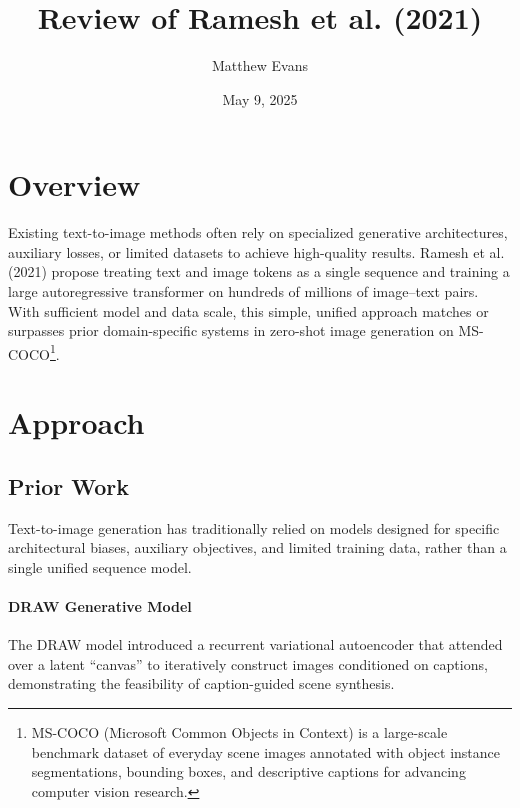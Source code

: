 \documentclass[10pt]{article}
\title{
    Review of Ramesh et al. (2021) \\
}
\author{Matthew Evans}
\date{May 9, 2025}
\begin{document}
\maketitle

\section*{Overview}
Existing text-to-image methods often rely on specialized generative architectures, auxiliary losses, or limited datasets to achieve high-quality results. Ramesh et al. (2021)\cite{DBLP:journals/corr/abs-2102-12092} propose treating text and image tokens as a single sequence and training a large autoregressive transformer on hundreds of millions of image–text pairs. With sufficient model and data scale, this simple, unified approach matches or surpasses prior domain-specific systems in zero-shot image generation on MS-COCO\footnote{MS-COCO (Microsoft Common Objects in Context) is a large-scale benchmark dataset of everyday scene images annotated with object instance segmentations, bounding boxes, and descriptive captions for advancing computer vision research.}.




\section*{Approach}
\subsection*{Prior Work}
Text-to-image generation has traditionally relied on models designed for specific architectural biases, auxiliary objectives, and limited training data, rather than a single unified sequence model.

\paragraph{DRAW Generative Model}
The DRAW\cite{DBLP:journals/corr/GregorDGW15} model introduced a recurrent variational autoencoder that attended over a latent ``canvas'' to iteratively construct images conditioned on captions, demonstrating the feasibility of caption-guided scene synthesis.
\end{document}
